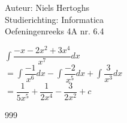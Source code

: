 \documentclass[a4paper]{article}
\begin{document}
  
\noindent \large Auteur: Niels Hertoghs \\
\noindent \large Studierichting: Informatica\\
\noindent \large Oefeningenreeks 4A nr. 6.4\\

\medskip

\normalsize

$\displaystyle\int \dfrac{-x - 2x^2 + 3x^4}{x^7} dx$\\

$ = \displaystyle\int \dfrac{-1}{x^6} dx - \displaystyle\int \dfrac{-2}{x^5} dx + \displaystyle\int \dfrac{3}{x^3} dx$\\

$= \dfrac{1}{5x^5} + \dfrac{1}{2x^4} - \dfrac{3}{2x^2} + c$\\



\begin{thebibliography}{999}
\end{thebibliography}
\end{document}
